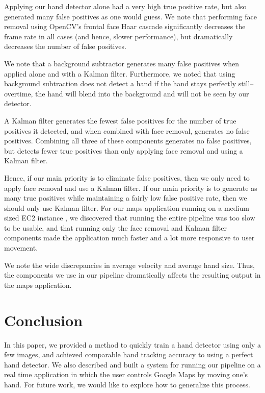 \documentclass[12pt]{article}
\begin{document}
Applying our hand detector alone had a very high true positive rate, but also generated many false positives as one would guess. We note that performing face removal using OpenCV's frontal face Haar cascade significantly decreases the frame rate in all cases (and hence, slower performance), but dramatically decreases the number of false positives. 

We note that a background subtractor generates many false positives when applied alone and with a Kalman filter. Furthermore, we noted that using background subtraction does not detect a hand if the hand stays perfectly still--overtime, the hand will blend into the background and will not be seen by our detector. 

A Kalman filter generates the fewest false positives for the number of true positives it detected, and when combined with face removal, generates no false positives. Combining all three of these components generates no false positives, but detects fewer true positives than only applying face removal and using a Kalman filter. 

Hence, if our main priority is to eliminate false positives, then we only need to apply face removal and use a Kalman filter. If our main priority is to generate as many true positives while maintaining a fairly low false positive rate, then we should only use Kalman filter. For our maps application running on a medium sized EC2 instance \cite{ec2}, we discovered that running the entire pipeline was too slow to be usable, and that running only the face removal and Kalman filter components made the application much faster and a lot more responsive to user movement.

We note the wide discrepancies in average velocity and average hand size. Thus, the components we use in our pipeline dramatically affects the resulting output in the maps application.


\section{Conclusion}

In this paper, we provided a method to quickly train a hand detector using only a few images, and achieved comparable hand tracking accuracy to using a perfect hand detector. We also described and built a system for running our pipeline on a real time application in which the user controls Google Maps by moving one's hand. For future work, we would like to explore how to generalize this process. 
\end{document}
